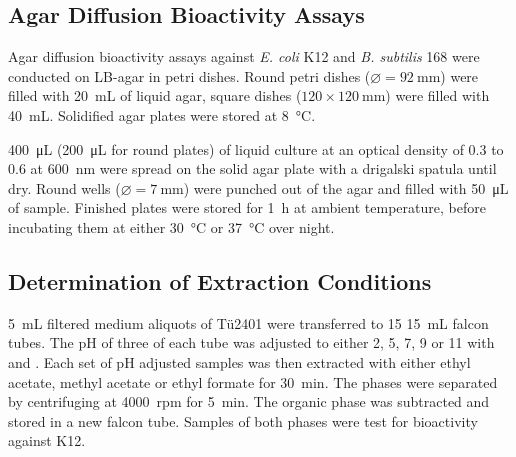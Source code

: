 
	\subsection{Agar Diffusion Bioactivity Assays} %
	\label{sub:agar_diffusion_bioactivity_assays}

	Agar diffusion bioactivity assays against \emph{E. coli} K12 and \emph{B. subtilis} 168 were conducted on LB-agar in petri dishes. Round petri dishes ($\varnothing=\SI{92}{\milli\meter}$) were filled with \SI{20}{\milli\liter} of liquid agar, square dishes ($120\times \SI{120}{\milli\meter}$) were filled with \SI{40}{\milli\liter}. Solidified agar plates were stored at \SI{8}{\celsius}.

	\SI{400}{\micro\liter} (\SI{200}{\micro\liter} for round plates) of liquid culture at an optical density of 0.3 to 0.6 at \SI{600}{\nano\meter} were spread on the solid agar plate with a drigalski spatula until dry. Round wells ($\varnothing=\SI{7}{\milli\meter}$) were punched out of the agar and filled with \SI{50}{\micro\liter} of sample. Finished plates were stored for \SI{1}{\hour} at ambient temperature, before incubating them at either \SI{30}{\celsius} or \SI{37}{\celsius} over night.


	\subsection{Determination of Extraction Conditions} %
	\label{sub:determination_of_extraction_conditions}

	\SI{5}{\milli\liter} filtered medium aliquots of Tü2401 were transferred to 15 \SI{15}{\milli\liter} falcon tubes. The pH of three of each tube was adjusted to either 2, 5, 7, 9 or 11 with  and . Each set of pH adjusted samples was then extracted with either ethyl acetate, methyl acetate or ethyl formate for \SI{30}{\minute}. The phases were separated by centrifuging at 4000~rpm for \SI{5}{\minute}. The organic phase was subtracted and stored in a new falcon tube. Samples of both phases were test for bioactivity against K12.


